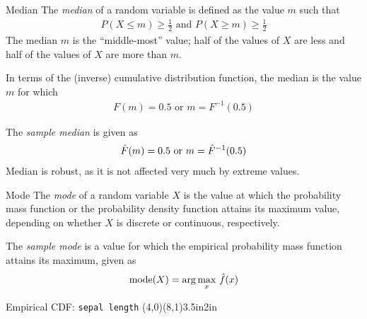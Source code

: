 \begin{frame}{Median}
The {\em median}
of a random variable is def\/{i}ned as the value $m$ such that
\begin{align*}
    P(X \le m) \ge \frac{1}{2} \mbox{  and  } P(X \ge m) \ge \frac{1}{2}
\end{align*}
The median $m$ is the ``middle-most'' value; half
of the values of $X$ are less and half of the values of $X$
are more than $m$. 

\bigskip
In terms of the (inverse) cumulative
distribution function, the median is the
value $m$ for which
\begin{align*}
    F(m) = 0.5 \text{  or  } m = F^{-1}(0.5)
\end{align*}

\bigskip
The {\em sample median} is given as
\begin{align*}
    \hat{F}(m) = 0.5 \text{ or } m = \hat{F}^{-1}(0.5)
\end{align*}
Median is robust, as it is not affected very
much by extreme values. 
\end{frame}

\begin{frame}{Mode}
The {\em mode} of a
random variable $X$ is the value at which the probability mass
function or the probability density function attains its maximum
value, depending on whether $X$ is discrete or continuous,
respectively.

\bigskip
The {\em sample mode} is a
value for
which the empirical probability mass function
attains its maximum, given as
\begin{align*}
    \mbox{mode}(X) = \arg \max_x\,\kern3pt\hat{\kern-3pt f}(x)
\end{align*}
\end{frame}


\begin{frame}{Empirical CDF: {\tt sepal length}}
\centering
    \psgraph[tickstyle=bottom,axesstyle=frame,%
    Dy=0.25,dy=0.25,Ox=4,Dx=0.5,dx=0.5]{->}(4,0)(8,1){3.5in}{2in}%
    \dataplot[linewidth=1.5pt]{\dCDF}
    \endpsgraph
\end{frame}


